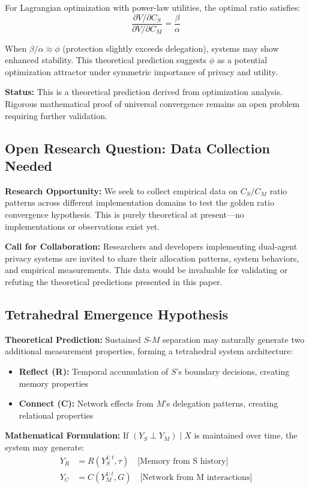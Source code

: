 \documentclass[11pt,a4paper]{article}
\theoremstyle{definition}
\newcommand{\given}{\mid}
\newcommand{\indep}{\perp}
\begin{document}
For Lagrangian optimization with power-law utilities, the optimal ratio satisfies:
\[
\frac{\partial V/\partial C_S}{\partial V/\partial C_M} = \frac{\beta}{\alpha}
\]

When $\beta/\alpha \approx \phi$ (protection slightly exceeds delegation), systems may show enhanced stability. This theoretical prediction suggests $\phi$ as a potential optimization attractor under symmetric importance of privacy and utility.

\textbf{Status:} This is a theoretical prediction derived from optimization analysis. Rigorous mathematical proof of universal convergence remains an open problem requiring further validation.

\subsection{Open Research Question: Data Collection Needed}

\textbf{Research Opportunity:} We seek to collect empirical data on $C_S/C_M$ ratio patterns across different implementation domains to test the golden ratio convergence hypothesis. This is purely theoretical at present---no implementations or observations exist yet.

\textbf{Call for Collaboration:} Researchers and developers implementing dual-agent privacy systems are invited to share their allocation patterns, system behaviors, and empirical measurements. This data would be invaluable for validating or refuting the theoretical predictions presented in this paper.

\subsection{Tetrahedral Emergence Hypothesis}

\textbf{Theoretical Prediction:} Sustained $S$-$M$ separation may naturally generate two additional measurement properties, forming a tetrahedral system architecture:

\begin{itemize}
    \item \textbf{Reflect (R):} Temporal accumulation of $S$'s boundary decisions, creating memory properties
    \item \textbf{Connect (C):} Network effects from $M$'s delegation patterns, creating relational properties
\end{itemize}

\textbf{Mathematical Formulation:} If $(Y_S \indep Y_M) \given X$ is maintained over time, the system may generate:
\begin{align}
Y_R &= R(Y_S^{1:t}, \tau) \quad \text{[Memory from S history]} \\
Y_C &= C(Y_M^{1:t}, G) \quad \text{[Network from M interactions]}
\end{align}
\end{document}

